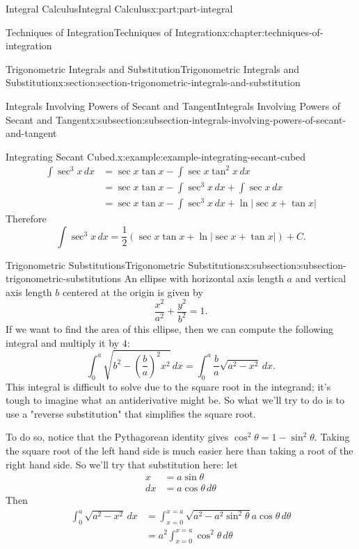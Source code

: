 \documentclass[twoside,10pt,]{book}
\numberwithin{equation}{part}
\begin{document}
\begin{partptx}{Integral Calculus}{}{Integral Calculus}{}{}{x:part:part-integral}
\begin{chapterptx}{Techniques of Integration}{}{Techniques of Integration}{}{}{x:chapter:techniques-of-integration}
\begin{sectionptx}{Trigonometric Integrals and Substitution}{}{Trigonometric Integrals and Substitution}{}{}{x:section:section-trigonometric-integrals-and-substitution}
\begin{subsectionptx}{Integrals Involving Powers of Secant and Tangent}{}{Integrals Involving Powers of Secant and Tangent}{}{}{x:subsection:subsection-integrals-involving-powers-of-secant-and-tangent}
\begin{example}{Integrating Secant Cubed.}{x:example:example-integrating-secant-cubed}
\begin{align*}
\int\sec^{3}x\,dx & = \sec x\tan x - \int \sec x\tan^{2}x\,dx \\
& = \sec x\tan x - \int\sec^{3}x\,dx + \int\sec x\,dx \\
& = \sec x\tan x - \int\sec^{3}x\,dx + \ln|\sec x + \tan x| 
\end{align*}
Therefore%
\begin{equation*}
\int\sec^{3}x\,dx = \frac{1}{2}(\sec x\tan x + \ln|\sec x + \tan x|) + C.
\end{equation*}
%
\end{example}
\end{subsectionptx}
%
%
\typeout{************************************************}
\typeout{************************************************}
%
\begin{subsectionptx}{Trigonometric Substitutions}{}{Trigonometric Substitutions}{}{}{x:subsection:subsection-trigonometric-substitutions}
An ellipse with horizontal axis length \(a\) and vertical axis length \(b\) centered at the origin is given by%
\begin{equation*}
\frac{x^{2}}{a^{2}} + \frac{y^{2}}{b^{2}} = 1.
\end{equation*}
If we want to find the area of this ellipse, then we can compute the following integral and multiply it by \(4\):%
\begin{equation*}
\int_{0}^{a}\sqrt{b^{2} - (\frac{b}{a})^{2}x^{2}}\,dx = \int_{0}^{a}\frac{b}{a}\sqrt{a^{2} - x^{2}}\,dx.
\end{equation*}
This integral is difficult to solve due to the square root in the integrand; it's tough to imagine what an antiderivative might be. So what we'll try to do is to use a "reverse substitution" that simplifies the square root.%
\par
To do so, notice that the Pythagorean identity gives \(\cos^{2}\theta = 1 - \sin^{2}\theta\). Taking the square root of the left hand side is much easier here than taking a root of the right hand side. So we'll try that substitution here: let%
\begin{align*}
x & = a\sin\theta \\
dx & = a\cos\theta\,d\theta 
\end{align*}
Then%
\begin{align*}
\int_{0}^{a}\sqrt{a^{2} - x^{2}}\,dx & = \int_{x = 0}^{x = a}\sqrt{a^{2} - a^{2}\sin^{2}\theta}a\cos\theta\,d\theta \\
& = a^{2}\int_{x = 0}^{x = a}\cos^{2}\theta\,d\theta 

\end{align*}
\end{subsectionptx}
\end{sectionptx}
\end{chapterptx}
\end{partptx}
\end{document}

